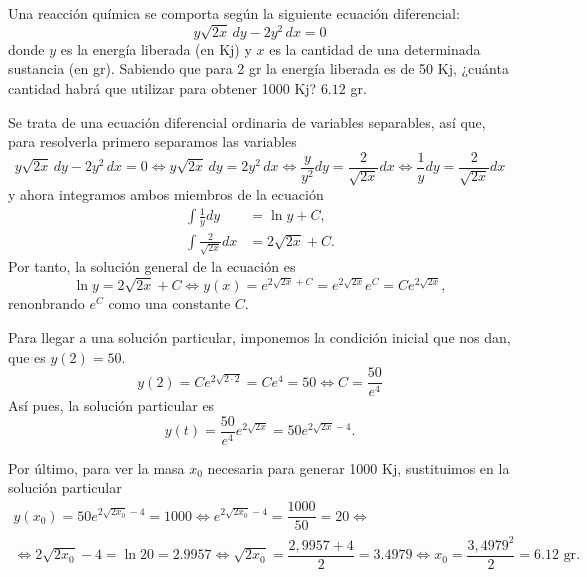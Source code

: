 {Una reacción química se comporta según la siguiente ecuación diferencial:
\[
y\sqrt {2x} \,dy - 2y^2 \,dx = 0
\]
donde $y$ es la energía liberada (en Kj) y $x$ es la cantidad de una determinada sustancia (en gr). Sabiendo que para 2
gr la energía liberada es de 50 Kj, ¿cuánta cantidad habrá que utilizar para obtener 1000 Kj?}
{$6.12$  gr.
}
{Se trata de una ecuación diferencial ordinaria de variables separables, así que, para resolverla primero separamos las variables
\[
y\sqrt {2x} \,dy - 2y^2 \,dx = 0
\Leftrightarrow
y\sqrt {2x} \,dy =  2y^2 \,dx 
\Leftrightarrow
\frac{y}{y^2}dy =  \frac{2}{\sqrt{2x}}dx 
\Leftrightarrow
\frac{1}{y}dy =  \frac{2}{\sqrt{2x}}dx 
\]
y ahora integramos ambos miembros de la ecuación
\begin{align*}
\int \frac{1}{y}dy &= \ln y +C, \\
\int \frac{2}{\sqrt{2x}}dx &= 2\sqrt{2x}+C.
\end{align*}
Por tanto, la solución general de la ecuación es
\[
\ln y = 2\sqrt{2x}+C 
\Leftrightarrow
y(x) = e^{2\sqrt{2x}+C} = e^{2\sqrt{2x}}e^C = C e^{2\sqrt{2x}},
\]
renonbrando $e^C$ como una constante $C$. 

Para llegar a una solución particular, imponemos la condición inicial que nos dan, que es $y(2)=50$.
\[
y(2) = C e^{2\sqrt{2\cdot 2}} = C e^4 = 50  
\Leftrightarrow
C = \frac{50}{e^4}
\]
Así pues, la solución particular es
\[
y(t) = \frac{50}{e^4} e^{2\sqrt{2x}} = 50  e^{2\sqrt{2x}-4}.
\]

Por último, para ver la masa $x_0$ necesaria para generar 1000 Kj, sustituimos en la solución particular
\[
\renewcommand{\arraystretch}{2}
\begin{array}{c}
y(x_0) = 50  e^{2\sqrt{2x_0}-4} = 1000 
\Leftrightarrow
e^{2\sqrt{2x_0}-4} = 	\dfrac{1000}{50} = 20
\Leftrightarrow \\
\Leftrightarrow 
2\sqrt{2x_0}-4 = 	\ln 20 = 2.9957
\Leftrightarrow
\sqrt{2x_0} = \dfrac{2,9957+4}{2} = 3.4979
\Leftrightarrow
x_0 = \dfrac{3,4979 ^2}{2} = 6.12 \mbox{ gr}.
\end{array}
\]
}


